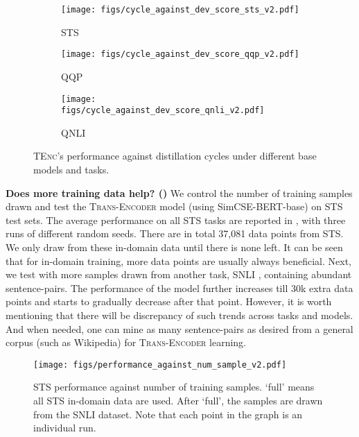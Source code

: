 \documentclass{article} \usepackage{iclr2021_conference,times}
\newcommand{\modelname}{\textsc{Trans-Encoder}\xspace}
\newcommand{\tenc}{\textsc{TEnc}\xspace}
\begin{document}
\begin{figure}
\begin{subfigure}{.4\textwidth}
  \centering
  \texttt{[image: figs/cycle\_against\_dev\_score\_sts\_v2.pdf]}
  \vspace{-4.0mm}
  \caption{STS}
  \label{fig:sfig1}
\end{subfigure}\begin{subfigure}{.28\textwidth}
  \centering
  \texttt{[image: figs/cycle\_against\_dev\_score\_qqp\_v2.pdf]}
  \vspace{-4.0mm}
  \caption{QQP}
  \label{fig:sfig2}
\end{subfigure}
\begin{subfigure}{.28\textwidth}
  \centering
  \texttt{[image: figs/cycle\_against\_dev\_score\_qnli\_v2.pdf]}
  \vspace{-4.0mm}
  \caption{QNLI}
  \label{fig:sfig3}
\end{subfigure}
\vspace{-2.0mm}
\caption{\tenc's performance against distillation cycles under different base models and tasks.}
\label{fig:cycle}
\vspace{-2.0mm}
\end{figure}

\textbf{Does more training data help? ()} We control the number of training samples drawn and test the \modelname model (using SimCSE-BERT-base) on STS test sets. The average performance on all STS tasks are reported in , with three runs of different random seeds. There are in total 37,081 data points from STS. We only draw from these in-domain data until there is none left. It can be seen that for in-domain training, more data points are usually always beneficial. Next, we test with more samples drawn from another task, SNLI \citep{bowman-etal-2015-large}, containing abundant sentence-pairs. The performance of the model further increases till 30k extra data points and starts to gradually decrease after that point. However, it is worth mentioning that there will be discrepancy of such trends across tasks and models. And when needed, one can mine as many sentence-pairs as desired from a general corpus (such as Wikipedia) for \modelname learning. 




\begin{SCfigure}
  \caption{STS performance against number of training samples. `full' means all STS in-domain data are used. After `full', the samples are drawn from the SNLI dataset. Note that each point in the graph is an individual run.}
  \texttt{[image: figs/performance\_against\_num\_sample\_v2.pdf]}
   \label{fig:num_sample}
   \vspace{-3.0mm}
\end{SCfigure}
\end{document}
